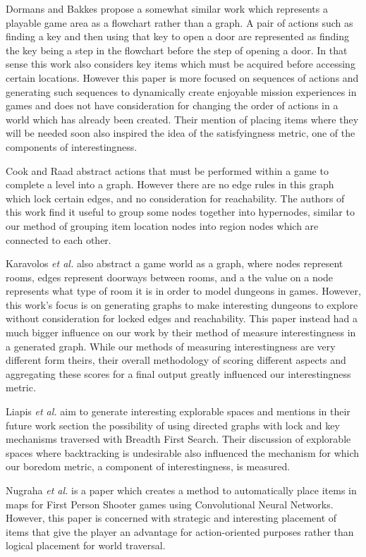 \documentclass{ieeeaccess}
\begin{document}
Dormans and Bakkes \cite{b1} propose a somewhat similar work which represents a playable game
area as a flowchart rather than a graph. A pair of actions such as finding a key and then using
that key to open a door are represented as finding the key being a step in the flowchart before
the step of opening a door. In that sense this work also considers key items which must be
acquired before accessing certain locations. However this paper is more focused on sequences of
actions and generating such sequences to dynamically create enjoyable mission experiences in
games and does not have consideration for changing the order of actions in a world which has
already been created. Their mention of placing items where they will be needed soon also
inspired the idea of the satisfyingness metric, one of the components of interestingness.

Cook and Raad \cite{b2} abstract actions that must be performed within a game to complete a
level into a graph. However there are no edge rules in this graph which lock certain edges, and
no consideration for reachability. The authors of this work find it useful to group some nodes
together into hypernodes, similar to our method of grouping item location nodes into region
nodes which are connected to each other.

Karavolos {\it et al.} \cite{b3} also abstract a game world as a graph, where nodes represent
rooms, edges represent doorways between rooms, and a the value on a node represents what type of
room it is in order to model dungeons in games. However, this work's focus is on generating
graphs to make interesting dungeons to explore without consideration for locked edges and
reachability. This paper instead had a much bigger influence on our work by their method of
measure interestingness in a generated graph. While our methods of measuring interestingness are
very different form theirs, their overall methodology of scoring different aspects and
aggregating these scores for a final output greatly influenced our interestingness metric.

Liapis {\it et al.} \cite{b4} aim to generate interesting explorable spaces and mentions in
their future work section the possibility of using directed graphs with lock and key mechanisms
traversed with Breadth First Search. Their discussion of explorable spaces where backtracking is
undesirable also influenced the mechanism for which our boredom metric, a component of
interestingness, is measured.

Nugraha {\it et al.} \cite{b5} is a paper which creates a method to automatically place items 
in maps for First Person Shooter games using Convolutional Neural Networks. However, this paper is 
concerned with strategic and interesting placement of items that give the player an advantage for 
action-oriented purposes rather than logical placement for world traversal.
\end{document}
